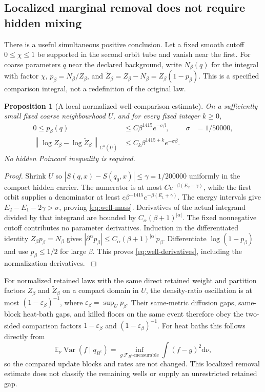 \documentclass[11pt,oneside,openany]{book}
\newtheorem{proposition}[proposition]{Proposition}
\theoremstyle{definition}
\theoremstyle{remark}
\newcommand{\E}{\mathbb E}
\newcommand{\dd}{\mathrm d}
\newcommand{\Var}{\operatorname{Var}}
\newcommand{\norm}[1]{\left\lVert#1\right\rVert}
\newcommand{\src}[2]{\cite[#2]{#1}}
\begin{document}
\subsection{Localized marginal removal does not require hidden mixing}
\label{sec:well-removal}
There is a useful simultaneous positive conclusion. Let a fixed smooth
cutoff $0\le\chi\le1$ be supported in the second orbit tube and vanish
near the first. For coarse parameters $q$ near the declared background,
write $N_\beta(q)$ for the integral with factor $\chi$,
$p_\beta=N_\beta/Z_\beta$, and
$\widetilde Z_\beta=Z_\beta-N_\beta=Z_\beta(1-p_\beta)$.
This is a specified comparison integral, not a redefinition of the
original law.

\begin{proposition}[A local normalized well-comparison estimate]
\label{prop:well-removal}
On a sufficiently small fixed coarse neighbourhood $U$, and for every
fixed integer $k\ge0$,
\begin{align}
 0\le p_\beta(q)&\le C\beta^{1415}e^{-\sigma\beta},
                  &\sigma&=1/50000,\label{eq:well-mass}\\
 \norm{\log Z_\beta-\log\widetilde Z_\beta}_{C^k(\overline U)}
        &\le C_k\beta^{1415+k}e^{-\sigma\beta}.\label{eq:well-derivatives}
\end{align}
No hidden Poincar\'e inequality is required.
\end{proposition}
\begin{proof}
Shrink $U$ so $|S(q,x)-S(q_0,x)|\le\gamma=1/200000$ uniformly
in the compact hidden carrier. The numerator is at most
$Ce^{-\beta(E_2-\gamma)}$, while the first orbit supplies a denominator
at least $c\beta^{-1415}e^{-\beta(E_1+\gamma)}$.
The energy intervals give $E_2-E_1-2\gamma>\sigma$, proving
\cref{eq:well-mass}. Derivatives of the actual integrand divided by
that integrand are bounded by $C_\alpha(\beta+1)^{|\alpha|}$.
The fixed nonnegative cutoff contributes no parameter derivatives.
Induction in the differentiated identity $Z_\beta p_\beta=N_\beta$
gives
$|\partial^\alpha p_\beta|\le C_\alpha(\beta+1)^{|\alpha|}p_\beta$.
Differentiate $\log(1-p_\beta)$ and use $p_\beta\le1/2$ for large
$\beta$. This proves \cref{eq:well-derivatives}, including the
normalization derivatives. \src{F13}{V9}
\end{proof}
For normalized retained laws with the same direct retained weight and
partition factors $Z_\beta$ and $\widetilde Z_\beta$ on a compact
domain in $U$, the density-ratio oscillation is at most
$(1-\varepsilon_\beta)^{-1}$, where
$\varepsilon_\beta=\sup_U p_\beta$. Their same-metric diffusion gaps,
same-block heat-bath gaps, and killed floors on the same event therefore
obey the two-sided comparison factors
$1-\varepsilon_\beta$ and $(1-\varepsilon_\beta)^{-1}$.
For heat baths this follows directly from
\[
 \E_\nu\Var(f\mid q_{B^c})
    =\inf_{g\ \mathscr F_{B^c}\text{-measurable}}\int(f-g)^2\dd\nu,
\]
so the compared update blocks and rates are not changed. This
localized removal estimate does not classify the remaining wells or
supply an unrestricted retained gap.
\end{document}
